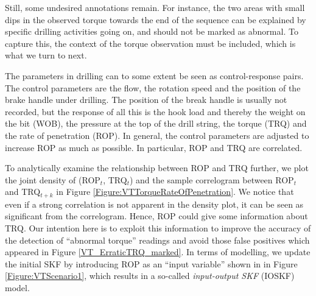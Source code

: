 Still, some undesired annotations remain. For instance, the two areas with small dips in the observed torque towards the end of the sequence can be explained by specific drilling activities going on, and should not be marked as abnormal. To capture this, the context of the torque observation must be included, which is what we turn to next.

The parameters in drilling can to some extent be seen as control-response pairs. The control parameters are the flow, the rotation speed and the position of the brake handle under drilling. The position of the break handle is usually not recorded, but the response of all this is the hook load and thereby the weight on the bit (WOB), the pressure at the top of the drill string, the torque (TRQ) and the rate of penetration (ROP). In general, the control parameters are adjusted to increase ROP as much as possible. In particular, ROP and TRQ are correlated.

To analytically examine the relationship between ROP and TRQ further, we plot the joint density of (ROP$_t$, TRQ$_t$) and the sample correlogram between ROP$_t$ and TRQ$_{t+k}$ in Figure \ref{Figure:VTTorqueRateOfPenetration}. We notice that even if a strong correlation is not apparent in the density plot, it can be seen as significant from the correlogram. Hence, ROP could give some information about TRQ. Our intention here is to exploit this information to improve the accuracy of the detection of ``abnormal torque'' readings and avoid those false positives which appeared in Figure \ref{VT_ErraticTRQ_marked}. In terms of modelling, we update the initial SKF by introducing ROP as an ``input variable'' shown in  in Figure \ref{Figure:VTScenario1}, which results in a so-called \textit{input-output SKF} (IOSKF) model. 

